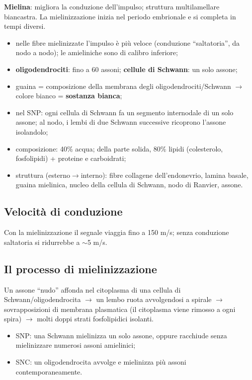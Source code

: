 \textbf{Mielina}: migliora la conduzione dell'impulso; struttura multilamellare biancastra. La
mielinizzazione inizia nel periodo embrionale e si completa in tempi diversi.
\begin{itemize}
  \item nelle fibre mielinizzate l'impulso è più veloce (conduzione ``saltatoria'', da nodo a
    nodo); le amieliniche sono di calibro inferiore;
  \item \textbf{oligodendrociti}: fino a 60 assoni; \textbf{cellule di Schwann}: un solo assone;
  \item guaina = composizione della membrana degli oligodendrociti/Schwann $\rightarrow$ colore
    bianco = \textbf{sostanza bianca};
  \item nel SNP: ogni cellula di Schwann fa un segmento internodale di un solo assone; al nodo, i
    lembi di due Schwann successive ricoprono l'assone isolandolo;
  \item composizione: 40\% acqua; della parte solida, 80\% lipidi (colesterolo, fosfolipidi) +
    proteine e carboidrati;
  \item struttura (esterno$\rightarrow$interno): fibre collagene dell'endonevrio, lamina basale,
    guaina mielinica, nucleo della cellula di Schwann, nodo di Ranvier, assone.
\end{itemize}

\subsection{Velocità di conduzione}
Con la mielinizzazione il segnale viaggia fino a 150 m/s; senza conduzione saltatoria si ridurrebbe
a $\sim$5 m/s.

\subsection{Il processo di mielinizzazione}
Un assone ``nudo'' affonda nel citoplasma di una cellula di Schwann/oligodendrocita $\rightarrow$ un
lembo ruota avvolgendosi a spirale $\rightarrow$ sovrapposizioni di membrana plasmatica (il
citoplasma viene rimosso a ogni spira) $\rightarrow$ molti doppi strati fosfolipidici isolanti.
\begin{itemize}
  \item SNP: una Schwann mielinizza un solo assone, oppure racchiude senza mielinizzare numerosi
    assoni amielinici;
  \item SNC: un oligodendrocita avvolge e mielinizza più assoni contemporaneamente.
\end{itemize}

